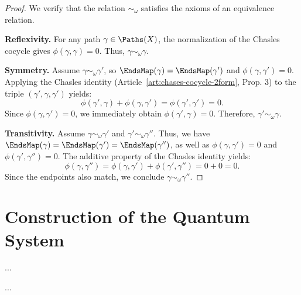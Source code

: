 \begin{proof}
  We verify that the relation $\sim_\omega$ satisfies the axioms of an equivalence relation.
  
  \textbf{Reflexivity.}
  For any path $\gamma \in \Paths(X)$,
  the normalization of the Chasles cocycle gives $\phi(\gamma,\gamma) = 0$.
  Thus, $\gamma \sim_\omega \gamma$.
  
  \textbf{Symmetry.}
  Assume $\gamma \sim_\omega \gamma'$, so $\EndsMap(\gamma) = \EndsMap(\gamma')$ and $\phi(\gamma,\gamma') = 0$.
  Applying the Chasles identity (Article~\ref{art:chases-cocycle-2form}, Prop. 3) to the triple $(\gamma', \gamma, \gamma')$ yields:
  \[
    \phi(\gamma',\gamma) + \phi(\gamma,\gamma') = \phi(\gamma',\gamma') = 0.
    \]
  Since $\phi(\gamma,\gamma') = 0$, we immediately obtain $\phi(\gamma',\gamma) = 0$.
  Therefore, $\gamma' \sim_\omega \gamma$.
  
  \textbf{Transitivity.}
  Assume $\gamma \sim_\omega \gamma'$ and $\gamma' \sim_\omega \gamma''$.
  Thus, we have $\EndsMap(\gamma) = \EndsMap(\gamma') = \EndsMap(\gamma'')$, as well as $\phi(\gamma,\gamma') = 0$ and $\phi(\gamma',\gamma'') = 0$.
  The additive property of the Chasles identity yields:
  \[
    \phi(\gamma,\gamma'') = \phi(\gamma,\gamma') + \phi(\gamma',\gamma'') = 0 + 0 = 0.
    \]
  Since the endpoints also match, we conclude $\gamma \sim_\omega \gamma''$.
\end{proof}

\section{Construction of the Quantum System}
\label{sec:Construction of the Quantum System}

\begin{article}
  \label{art:main-theorem-statement}
  ...
\end{article}

\begin{article}
  \label{art:groupoid-construction}
  ...
\end{article}

